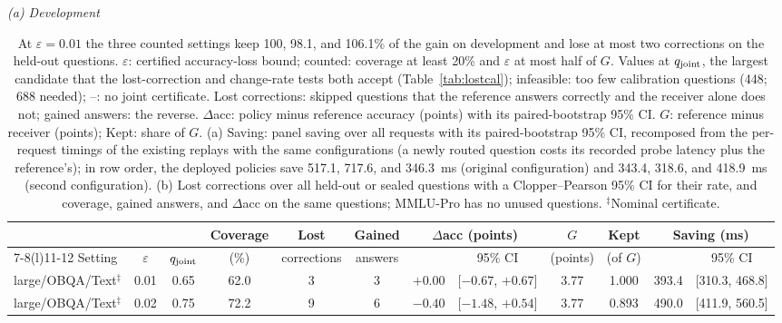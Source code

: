 \begin{table}[!htbp]\centering\scriptsize
\caption{At $\varepsilon=0.01$ the three counted settings keep 100, 98.1, and 106.1\% of the gain on development and lose at most two corrections on the held-out questions. $\varepsilon$: certified accuracy-loss bound; counted: coverage at least 20\% and $\varepsilon$ at most half of $G$. Values at $q_{\rm joint}$, the largest candidate that the lost-correction and change-rate tests both accept (Table~\ref{tab:lostcal}); infeasible: too few calibration questions (448; 688 needed); --: no joint certificate. Lost corrections: skipped questions that the reference answers correctly and the receiver alone does not; gained answers: the reverse. $\Delta$acc: policy minus reference accuracy (points) with its paired-bootstrap 95\% CI. $G$: reference minus receiver (points); Kept: share of $G$. (a) Saving: panel saving over all requests with its paired-bootstrap 95\% CI, recomposed from the per-request timings of the existing replays with the same configurations (a newly routed question costs its recorded probe latency plus the reference's); in row order, the deployed policies save 517.1, 717.6, and 346.3~ms (original configuration) and 343.4, 318.6, and 418.9~ms (second configuration). (b) Lost corrections over all held-out or sealed questions with a Clopper--Pearson 95\% CI for their rate, and coverage, gained answers, and $\Delta$acc on the same questions; MMLU-Pro has no unused questions. $^\ddagger$Nominal certificate.}
\label{tab:lostcert}
\renewcommand{\arraystretch}{1.15}\setlength{\tabcolsep}{2pt}
\vspace{5pt}\textit{(a) Development}\par\smallskip
\begin{tabular*}{\linewidth}{@{}l@{\hspace{4pt}\extracolsep{\fill}}ccccccccccc@{}}\toprule
& & & Coverage & Lost & Gained & \multicolumn{2}{c}{$\Delta$acc (points)} & $G$ & Kept & \multicolumn{2}{c}{Saving (ms)}\\\cmidrule(lr){7-8}\cmidrule(l){11-12}
Setting & $\varepsilon$ & $q_{\rm joint}$ & (\%) & corrections & answers & & 95\% CI & (points) & (of $G$) & & 95\% CI\\\midrule
large/OBQA/Text$^\ddagger$ & 0.01 & 0.65 & 62.0 & 3 & 3 & $+0.00$ & [$-0.67$, $+0.67$] & 3.77 & 1.000 & 393.4 & [310.3, 468.8]\\
large/OBQA/Text$^\ddagger$ & 0.02 & 0.75 & 72.2 & 9 & 6 & $-0.40$ & [$-1.48$, $+0.54$] & 3.77 & 0.893 & 490.0 & [411.9, 560.5]\\

\end{tabular*}
\end{table}
